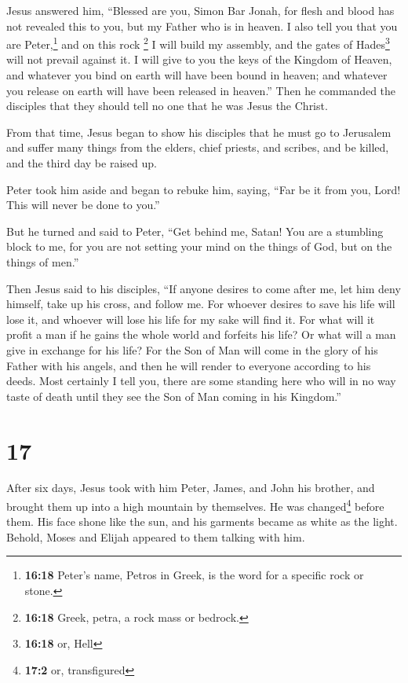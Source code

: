 Jesus answered him, ``Blessed are you, Simon Bar Jonah,
for flesh and blood has not revealed this to you, but my Father who is
in heaven.  I also tell you that you are
Peter,\footnote{\textbf{16:18} Peter's name, Petros in Greek, is the
  word for a specific rock or stone.} and on this rock \footnote{\textbf{16:18}
  Greek, petra, a rock mass or bedrock.} I will build my assembly, and
the gates of Hades\footnote{\textbf{16:18} or, Hell} will not prevail
against it.  I will give to you the keys of the Kingdom
of Heaven, and whatever you bind on earth will have been bound in
heaven; and whatever you release on earth will have been released in
heaven.''  Then he commanded the disciples that they
should tell no one that he was Jesus the Christ.

 From that time, Jesus began to show his disciples that
he must go to Jerusalem and suffer many things from the elders, chief
priests, and scribes, and be killed, and the third day be raised up.

 Peter took him aside and began to rebuke him, saying,
``Far be it from you, Lord! This will never be done to you.''

 But he turned and said to Peter, ``Get behind me, Satan!
You are a stumbling block to me, for you are not setting your mind on
the things of God, but on the things of men.''

 Then Jesus said to his disciples, ``If anyone desires to
come after me, let him deny himself, take up his cross, and follow me.
 For whoever desires to save his life will lose it, and
whoever will lose his life for my sake will find it.  For
what will it profit a man if he gains the whole world and forfeits his
life? Or what will a man give in exchange for his life? 
For the Son of Man will come in the glory of his Father with his angels,
and then he will render to everyone according to his deeds.
 Most certainly I tell you, there are some standing here
who will in no way taste of death until they see the Son of Man coming
in his Kingdom.''

\hypertarget{section-16}{%
\section{17}\label{section-16}}

 After six days, Jesus took with him Peter, James, and
John his brother, and brought them up into a high mountain by
themselves.  He was changed\footnote{\textbf{17:2} or,
  transfigured} before them. His face shone like the sun, and his
garments became as white as the light.  Behold, Moses and
Elijah appeared to them talking with him.

